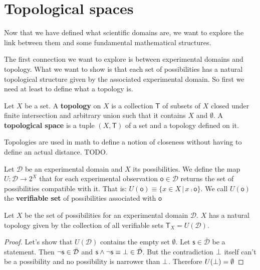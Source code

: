 \documentclass[11pt,letterpaper,fleqn]{memoir} %
\begin{document}
\section{Topological spaces}

Now that we have defined what scientific domains are, we want to explore the link between them and some fundamental mathematical structures.

The first connection we want to explore is between experimental domains and topology. What we want to show is that each set of possibilities has a natural topological structure given by the associated experimental domain. So first we need at least to define what a topology is.

\begin{mathSection}
	\begin{defn}
		Let $X$ be a set. A \textbf{topology} on $X$ is a collection $\mathsf{T}$ of subsets of $X$ closed under finite intersection and arbitrary union such that it contains $X$ and $\emptyset$. A \textbf{topological space} is a tuple $(X, \mathsf{T})$ of a set and a topology defined on it.
	\end{defn}
\end{mathSection}

Topologies are used in math to define a notion of closeness without having to define an actual distance. TODO.


\begin{mathSection}
	
\begin{defn}
	Let $\mathcal{D}$ be an experimental domain and $X$ its possibilities. We define the map $U : \mathcal{D} \rightarrow 2^X$ that for each experimental observation $\mathsf{o} \in \mathcal{D}$ returns the set of possibilities compatible with it. That is: $U(\mathsf{o})\equiv\{ x \in X \, | \, x \comp \mathsf{o}\}$. We call $U(\mathsf{o})$ the \textbf{verifiable set} of possibilities associated with $\mathsf{o}$
\end{defn}

\begin{prop}
	Let $X$ be the set of possibilities for an experimental domain $\mathcal{D}$. $X$ has a natural topology given by the collection of all verifiable sets $\mathsf{T}_X=U(\mathcal{D})$.
\end{prop}

\begin{proof}
	Let's show that $U(\mathcal{D})$ contains the empty set $\emptyset$. Let $\mathsf{s} \in \bar{\mathcal{D}}$ be a statement. Then $\neg\mathsf{s} \in \bar{\mathcal{D}}$ and $\mathsf{s} \wedge \neg\mathsf{s} \equiv \bot \in \bar{\mathcal{D}}$. But the contradiction $\bot$ itself can't be a possibility and no possibility is narrower than $\bot$. Therefore $U(\bot) = \emptyset$
\end{proof}
\end{mathSection}
\end{document}
